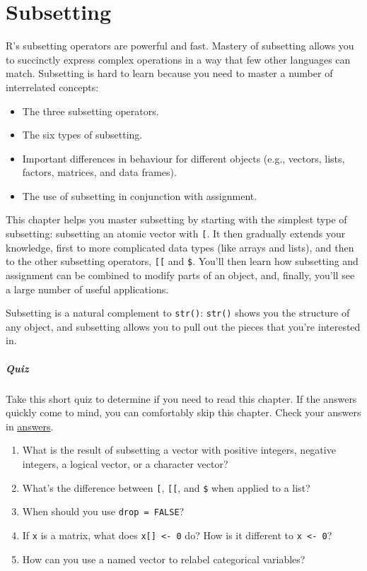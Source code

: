 \chapter{Subsetting}\label{subsetting}

R's subsetting operators are powerful and fast. Mastery of subsetting
allows you to succinctly express complex operations in a way that few
other languages can match. Subsetting is hard to learn because you need
to master a number of interrelated concepts:

\begin{itemize}
\item
  The three subsetting operators.
\item
  The six types of subsetting.
\item
  Important differences in behaviour for different objects (e.g.,
  vectors, lists, factors, matrices, and data frames).
\item
  The use of subsetting in conjunction with assignment.
\end{itemize}

This chapter helps you master subsetting by starting with the simplest
type of subsetting: subsetting an atomic vector with \texttt{{[}}. It
then gradually extends your knowledge, first to more complicated data
types (like arrays and lists), and then to the other subsetting
operators, \texttt{{[}{[}} and \texttt{\$}. You'll then learn how
subsetting and assignment can be combined to modify parts of an object,
and, finally, you'll see a large number of useful applications.

Subsetting is a natural complement to \texttt{str()}: \texttt{str()}
shows you the structure of any object, and subsetting allows you to pull
out the pieces that you're interested in. 

\paragraph{Quiz}

Take this short quiz to determine if you need to read this chapter. If
the answers quickly come to mind, you can comfortably skip this chapter.
Check your answers in \hyperref[subsetting-answers]{answers}.

\begin{enumerate}
\def\labelenumi{\arabic{enumi}.}
\item
  What is the result of subsetting a vector with positive integers,
  negative integers, a logical vector, or a character vector?
\item
  What's the difference between \texttt{{[}}, \texttt{{[}{[}}, and
  \texttt{\$} when applied to a list?
\item
  When should you use \texttt{drop = FALSE}?
\item
  If \texttt{x} is a matrix, what does \texttt{x{[}{]} \textless{}- 0}
  do? How is it different to \texttt{x \textless{}- 0}?
\item
  How can you use a named vector to relabel categorical variables?
\end{enumerate}

